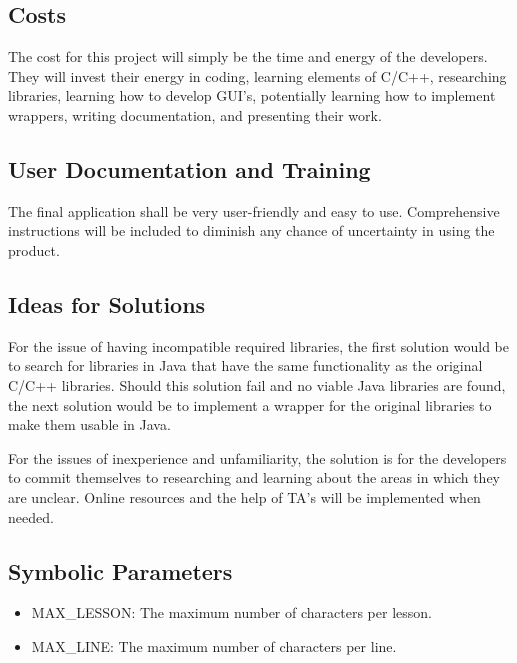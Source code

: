 \documentclass[12pt, titlepage]{article}
\begin{document}
\subsection{Costs}
\indent \indent The cost for this project will simply be the time and energy of the developers. They will invest their energy in coding, learning elements of C/C++, researching libraries, learning how to develop GUI's, potentially learning how to implement wrappers, writing documentation, and presenting their work.

\subsection{User Documentation and Training}
\indent \indent The final application shall be very user-friendly and easy to use. Comprehensive instructions will be included to diminish any chance of uncertainty in using the product.

\subsection{Ideas for Solutions}
\indent \indent For the issue of having incompatible required libraries, the first solution would be to search for libraries in Java that have the same functionality as the original C/C++ libraries. Should this solution fail and no viable Java libraries are found, the next solution would be to implement a wrapper for the original libraries to make them usable in Java.

\indent For the issues of inexperience and unfamiliarity, the solution is for the developers to commit themselves to researching and learning about the areas in which they are unclear. Online resources and the help of TA's will be implemented when needed.

\newpage

\subsection{Symbolic Parameters} \label{symbols}

\begin{itemize}
\item MAX\_LESSON: The maximum number of characters per lesson.
\item MAX\_LINE: The maximum number of characters per line.
\end{itemize}
\end{document}
